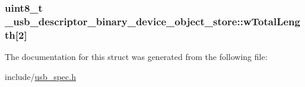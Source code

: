 \hypertarget{struct__usb__descriptor__binary__device__object__store_a01e75ad6e3e292f57f2008350990e3c8}{
\subsubsection[{w\-Total\-Length}]{\setlength{\rightskip}{0pt plus 5cm}uint8\-\_\-t \-\_\-usb\-\_\-descriptor\-\_\-binary\-\_\-device\-\_\-object\-\_\-store\-::w\-Total\-Length\mbox{[}2\mbox{]}}}\label{struct__usb__descriptor__binary__device__object__store_a01e75ad6e3e292f57f2008350990e3c8}


The documentation for this struct was generated from the following file\-:\begin{DoxyCompactItemize}
\item 
include/\hyperlink{usb__spec_8h}{usb\-\_\-spec.\-h}\end{DoxyCompactItemize}
